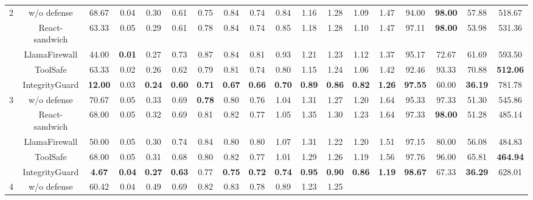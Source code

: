 \begin{table}[t]
\begin{tabular}{c|cccc|cccc|cccc|ccccc}
\multirow{5}{*}{2} &
  w/o defense &
  68.67 &
  0.04 &
  0.30 &
  0.61 &
  0.75 &
  0.84 &
  0.74 &
  0.84 &
  1.16 &
  1.28 &
  1.09 &
  1.47 &
  94.00 &
  \textbf{98.00} &
  57.88 &
  518.67 \\
 &
  React-sandwich &
  63.33 &
  0.05 &
  0.29 &
  0.61 &
  0.78 &
  0.84 &
  0.74 &
  0.85 &
  1.18 &
  1.28 &
  1.10 &
  1.47 &
  97.11 &
  \textbf{98.00} &
  53.98 &
  531.36 \\
 &
  LlamaFirewall &
  44.00 &
  \textbf{0.01} &
  0.27 &
  0.73 &
  0.87 &
  0.84 &
  0.81 &
  0.93 &
  1.21 &
  1.23 &
  1.12 &
  1.37 &
  95.17 &
  72.67 &
  61.69 &
  593.50 \\
 &
  ToolSafe &
  63.33 &
  0.02 &
  0.26 &
  0.62 &
  0.79 &
  0.81 &
  0.74 &
  0.80 &
  1.15 &
  1.24 &
  1.06 &
  1.42 &
  92.46 &
  93.33 &
  70.88 &
  \textbf{512.06} \\
 &
  IntegrityGuard &
  \textbf{12.00} &
  0.03 &
  \textbf{0.24} &
  \textbf{0.60} &
  \textbf{0.71} &
  \textbf{0.67} &
  \textbf{0.66} &
  \textbf{0.70} &
  \textbf{0.89} &
  \textbf{0.86} &
  \textbf{0.82} &
  \textbf{1.26} &
  \textbf{97.55} &
  60.00 &
  \textbf{36.19} &
  781.78 \\ \midrule \midrule
\multirow{5}{*}{3} &
  w/o defense &
  70.67 &
  0.05 &
  0.33 &
  0.69 &
  \textbf{0.78} &
  0.80 &
  0.76 &
  1.04 &
  1.31 &
  1.27 &
  1.20 &
  1.64 &
  95.33 &
  97.33 &
  51.30 &
  545.86 \\
 &
  React-sandwich &
  68.00 &
  0.05 &
  0.32 &
  0.69 &
  0.81 &
  0.82 &
  0.77 &
  1.05 &
  1.35 &
  1.30 &
  1.23 &
  1.64 &
  97.33 &
  \textbf{98.00} &
  51.28 &
  485.14 \\
 &
  LlamaFirewall &
  50.00 &
  0.05 &
  0.30 &
  0.74 &
  0.84 &
  0.80 &
  0.80 &
  1.07 &
  1.31 &
  1.22 &
  1.20 &
  1.51 &
  97.15 &
  80.00 &
  56.08 &
  484.83 \\
 &
  ToolSafe &
  68.00 &
  0.05 &
  0.31 &
 0.68 &
  0.80 &
  0.82 &
  0.77 &
  1.01 &
  1.29 &
  1.26 &
  1.19 &
  1.56 &
  97.76 &
  96.00 &
  65.81 &
  \textbf{464.94} \\
 &
  IntegrityGuard &
  \textbf{4.67} &
  \textbf{0.04} &
  \textbf{0.27} &
  \textbf{0.63} &
  0.77 &
  \textbf{0.75} &
  \textbf{0.72} &
  \textbf{0.74} &
  \textbf{0.95} &
  \textbf{0.90} &
  \textbf{0.86} &
  \textbf{1.19} &
  \textbf{98.67} &
  67.33 &
  \textbf{36.29} &
  628.01 \\ \midrule \midrule
\multirow{5}{*}{4} &
  w/o defense &
  60.42 &
  0.04 &
  0.49 &
  0.69 &
  0.82 &
  0.83 &
  0.78 &
  0.89 &
  1.23 &
  1.25 &

\end{tabular}
\end{table}
